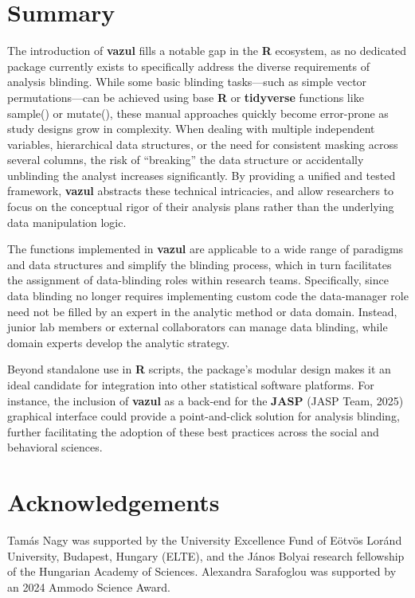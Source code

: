 \documentclass[
  english,
  man,floatsintext]{apa6}
\begin{document}
\section{Summary}\label{summary}

The introduction of \textbf{vazul} fills a notable gap in the \textbf{R} ecosystem, as no dedicated package currently exists to specifically address the diverse requirements of analysis blinding. While some basic blinding tasks---such as simple vector permutations---can be achieved using base \textbf{R} or \textbf{tidyverse} functions like sample() or mutate(), these manual approaches quickly become error-prone as study designs grow in complexity. When dealing with multiple independent variables, hierarchical data structures, or the need for consistent masking across several columns, the risk of ``breaking'' the data structure or accidentally unblinding the analyst increases significantly. By providing a unified and tested framework, \textbf{vazul} abstracts these technical intricacies, and allow researchers to focus on the conceptual rigor of their analysis plans rather than the underlying data manipulation logic.

The functions implemented in \textbf{vazul} are applicable to a wide range of paradigms and data structures and simplify the blinding process, which in turn facilitates the assignment of data-blinding roles within research teams. Specifically, since data blinding no longer requires implementing custom code the data-manager role need not be filled by an expert in the analytic method or data domain. Instead, junior lab members or external collaborators can manage data blinding, while domain experts develop the analytic strategy.

Beyond standalone use in \textbf{R} scripts, the package's modular design makes it an ideal candidate for integration into other statistical software platforms. For instance, the inclusion of \textbf{vazul} as a back-end for the \textbf{JASP} (JASP Team, 2025) graphical interface could provide a point-and-click solution for analysis blinding, further facilitating the adoption of these best practices across the social and behavioral sciences.

\section{Acknowledgements}\label{acknowledgements}

Tamás Nagy was supported by the University Excellence Fund of Eötvös Loránd University, Budapest, Hungary (ELTE), and the János Bolyai research fellowship of the Hungarian Academy of Sciences. Alexandra Sarafoglou was supported by an 2024 Ammodo Science Award.
\end{document}
